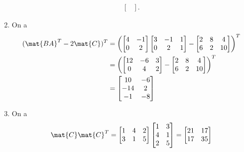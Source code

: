 \begin{exercice}
\begin{sol}
\begin{enumerate}
\begin{align*}
\begin{bmatrix}
        \end{bmatrix}.
      \end{align*}
    \item On a
      \begin{align*}
        (\mat{BA}^T - 2 \mat{C})^T
        &=
        \left(
          \begin{bmatrix}
            4 & -1 \\ 0 & 2
          \end{bmatrix}
          \begin{bmatrix}
            3 & -1 & 1 \\ 0 & 2 & 1
          \end{bmatrix} -
          \begin{bmatrix}
            2 & 8 & 4 \\ 6 & 2 & 10
          \end{bmatrix}
        \right)^T \\
        &=
        \left(
          \begin{bmatrix}
            12 & -6 & 3 \\ 0 & 4 & 2
          \end{bmatrix} -
          \begin{bmatrix}
            2 & 8 & 4 \\ 6 & 2 & 10
          \end{bmatrix}
        \right)^T \\
        &=
        \begin{bmatrix}
          10 & -6 \\ -14 & 2 \\ -1 & -8
        \end{bmatrix}
      \end{align*}
    \item On a
      \begin{align*}
        \mat{C} \mat{C}^T
        &=
        \begin{bmatrix}
          1 & 4 & 2 \\ 3 & 1 & 5
        \end{bmatrix}
        \begin{bmatrix}
          1 & 3 \\ 4 & 1 \\ 2 & 5
        \end{bmatrix} =
        \begin{bmatrix}
          21 & 17 \\ 17 & 35
        \end{bmatrix} \\

\end{align*}
\end{enumerate}
\end{sol}
\end{exercice}
